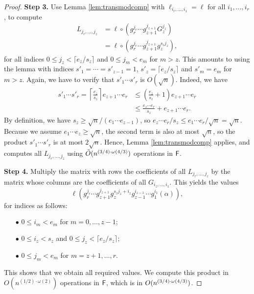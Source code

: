 \begin{proof}
\smallskip\noindent\textbf{Step 3.} Use Lemma \ref{lem:transmodcomp}
with $\ell_{i_r,\dots,i_1} = \ell$ for all $i_1,\dots,i_r$, to compute 
\begin{align*}
L_{j_r,\dots,j_z} &= \ell \circ (g_{r}^{j_{r}}\cdots g_{z+1}^{j_{z+1}}G_z^{j_z})\\ 
&= \ell \circ (g_{r}^{j_{r}}\cdots g_{z+1}^{j_{z+1}}g_{z}^{s_z j_z}),
\end{align*}
for all indices $0 \leq j_{z} < \lceil {e_{z}}/{s_z}\rceil$ and $0
\leq j_m < e_m$ for $m > z$. This amounts to using the lemma with
indices $s'_1=\cdots=s'_{z-1}=1$, $s'_z = \lceil {e_{z}}/{s_z}\rceil$
and $s'_m = e_m$ for $m > z$. Again, we have to verify that $s'_1
\cdots s'_r$ is $O(\sqrt n)$.  Indeed, we have
\begin{align*}
s'_1 \cdots s'_r  = \left \lceil \frac{e_{z}}{s_z}\right \rceil e_{z+1} \cdots e_r
&\le \left (\frac{e_{z}}{s_z} +1 \right) e_{z+1} \cdots e_r\\
&\le \frac{e_{z} \cdots e_r}{s_z} + e_{z+1} \cdots e_r.
\end{align*}
By definition, we have $s_z \ge \sqrt{n}/(e_1\cdots e_{z-1})$, so
$e_z \cdots e_r/s_z \le e_1 \cdots e_r /\sqrt{n} =\sqrt{n}$.
Because we assume $e_1 \cdots e_{z} \geq \sqrt{n}$, the second term is
also at most $\sqrt{n}$, so the product $s'_1 \cdots s'_r$ is at most
$2 \sqrt{n}$. Hence, Lemma \ref{lem:transmodcomp} applies, and computes
all $L_{j_r,\dots,j_z}$ using $\tilde{O}(n^{(3/4)\cdot \omega(4/3)})$ operations
in ${\mathsf{F}}$.

\smallskip\noindent\textbf{Step 4.} Multiply the matrix with rows the
coefficients of all $L_{j_r,\dots,j_z}$ by the matrix whose columns
are the coefficients of all $G_{i_z,\dots,i_1}$. This yields the
values
$$\ell( 
g_{r}^{j_{r}}\cdots g_{z+1}^{j_{z+1}}g_{z}^{s_z j_z+i_z} g_{z-1}^{i_{z-1}}\cdots
g_1^{i_1}(\alpha)),$$
for indices as follows:
\begin{itemize}
\item[$\bullet$] $0 \le i_m < e_m$ for $m=0,\dots,z-1$;
\item[$\bullet$] $0 \le i_z < s_z$ and $0 \le j_z< \lceil  e_z/s_z\rceil$;
\item[$\bullet$] $0 \le j_m < e_m$ for $m=z+1,\dots,r$.
\end{itemize}
This shows that we obtain all required values. We compute this product
in $O(n^{(1/2)\cdot\omega(2)})$ operations in ${\mathsf{F}}$, which is in
$O(n^{(3/4)\cdot \omega(4/3)})$.
\end{proof}

